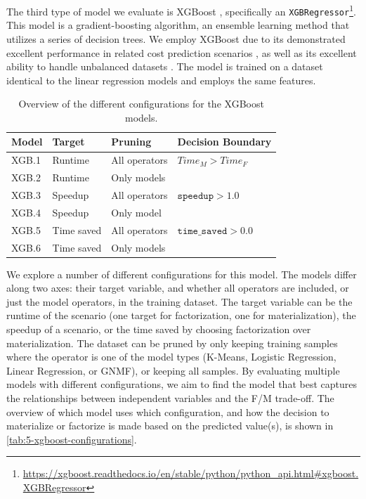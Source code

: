 The third type of model we evaluate is XGBoost \cite{xgboost}, specifically an \texttt{XGBRegressor}\footnote{\url{https://xgboost.readthedocs.io/en/stable/python/python_api.html\#xgboost.XGBRegressor}}. This model is a gradient-boosting algorithm, an ensemble learning method that utilizes a series of decision trees. We employ XGBoost due to its demonstrated excellent performance in related cost prediction scenarios \cite{tvm}, as well as its excellent ability to handle unbalanced datasets \cite{xgboost_imbalanced_data}. The model is trained on a dataset identical to the linear regression models and employs the same features.

\begin{table}[ht]
  \centering
  \begin{tabular}{llll}
    \toprule
    Model & Target     & Pruning       & Decision Boundary            \\
    \midrule \midrule
    XGB.1 & Runtime    & All operators & $Time_M > Time_F$            \\
    XGB.2 & Runtime    & Only models   &                              \\
    XGB.3 & Speedup    & All operators & $\texttt{speedup} > 1.0$     \\
    XGB.4 & Speedup    & Only model    &                              \\
    XGB.5 & Time saved & All operators & $\texttt{time\_saved} > 0.0$ \\
    XGB.6 & Time saved & Only models   &                              \\
    \bottomrule
  \end{tabular}
  \caption[XGBoost configurations]{Overview of the different configurations for the XGBoost models.}
  \label{tab:5-xgboost-configurations}
\end{table}

We explore a number of different configurations for this model. The models differ along two axes: their target variable, and whether all operators are included, or just the model operators, in the training dataset. The target variable can be the runtime of the scenario (one target for factorization, one for materialization), the speedup of a scenario, or the time saved by choosing factorization over materialization. The dataset can be pruned by only keeping training samples where the operator is one of the model types (K-Means, Logistic Regression, Linear Regression, or GNMF), or keeping all samples. By evaluating multiple models with different configurations, we aim to find the model that best captures the relationships between independent variables and the F/M trade-off. The overview of which model uses which configuration, and how the decision to materialize or factorize is made based on the predicted value(s), is shown in \autoref{tab:5-xgboost-configurations}.


